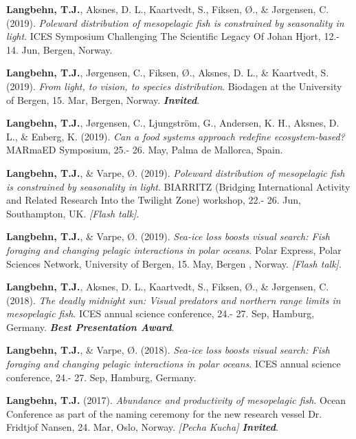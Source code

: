 \documentclass[11pt, a4paper]{awesome-cv}
\begin{document}
\leavevmode\hypertarget{ref-Langbehn9}{}%
\textbf{Langbehn, T.J.}, Aksnes, D. L., Kaartvedt, S., Fiksen, Ø., \&
Jørgensen, C. (2019). \emph{Poleward distribution of mesopelagic fish is
constrained by seasonality in light}. ICES Symposium Challenging The
Scientific Legacy Of Johan Hjort, 12.- 14. Jun, Bergen, Norway.

\leavevmode\hypertarget{ref-Langbehn5}{}%
\textbf{Langbehn, T.J.}, Jørgensen, C., Fiksen, Ø., Aksnes, D. L., \&
Kaartvedt, S. (2019). \emph{From light, to vision, to species
distribution}. Biodagen at the University of Bergen, 15. Mar, Bergen,
Norway. \emph{\textbf{Invited}}.

\leavevmode\hypertarget{ref-Langbehn8}{}%
\textbf{Langbehn, T.J.}, Jørgensen, C., Ljungström, G., Andersen, K. H.,
Aksnes, D. L., \& Enberg, K. (2019). \emph{Can a food systems approach
redefine ecosystem-based?} MARmaED Symposium, 25.- 26. May, Palma de
Mallorca, Spain.

\leavevmode\hypertarget{ref-Langbehn10}{}%
\textbf{Langbehn, T.J.}, \& Varpe, Ø. (2019). \emph{Poleward
distribution of mesopelagic fish is constrained by seasonality in
light}. BIARRITZ (Bridging International Activity and Related Research
Into the Twilight Zone) workshop, 22.- 26. Jun, Southampton, UK.
\emph{{[}Flash talk{]}}.

\leavevmode\hypertarget{ref-Langbehn7}{}%
\textbf{Langbehn, T.J.}, \& Varpe, Ø. (2019). \emph{Sea-ice loss boosts
visual search: Fish foraging and changing pelagic interactions in polar
oceans}. Polar Express, Polar Sciences Network, University of Bergen,
15. May, Bergen , Norway. \emph{{[}Flash talk{]}}.

\leavevmode\hypertarget{ref-Langbehn4}{}%
\textbf{Langbehn, T.J.}, Aksnes, D. L., Kaartvedt, S., Fiksen, Ø., \&
Jørgensen, C. (2018). \emph{The deadly midnight sun: Visual predators
and northern range limits in mesopelagic fish}. ICES annual science
conference, 24.- 27. Sep, Hamburg, Germany. \emph{\textbf{Best
Presentation Award}}.

\leavevmode\hypertarget{ref-Langbehn3}{}%
\textbf{Langbehn, T.J.}, \& Varpe, Ø. (2018). \emph{Sea-ice loss boosts
visual search: Fish foraging and changing pelagic interactions in polar
oceans}. ICES annual science conference, 24.- 27. Sep, Hamburg, Germany.

\leavevmode\hypertarget{ref-Langbehn2}{}%
\textbf{Langbehn, T.J.} (2017). \emph{Abundance and productivity of
mesopelagic fish}. Ocean Conference as part of the naming ceremony for
the new research vessel Dr. Fridtjof Nansen, 24. Mar, Oslo, Norway.
\emph{{[}Pecha Kucha{]} \textbf{Invited}}.
\end{document}
